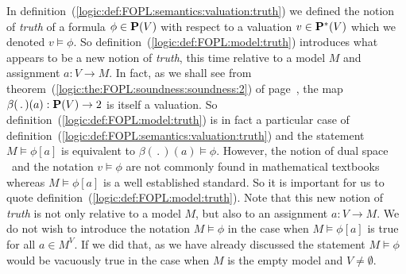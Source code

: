 In definition~(\ref{logic:def:FOPL:semantics:valuation:truth}) we
defined the notion of {\em truth} of a formula $\phi\in\mbox{${\bf P}(V)$}$ with
respect to a valuation $v\in\mbox{${\bf P}^{*}(V)$}$ which we denoted $v\vDash\phi$. So
definition~(\ref{logic:def:FOPL:model:truth}) introduces what
appears to be a new notion of {\em truth}, this time relative to a
model $M$ and assignment $a:V\to M$. In fact, as we shall see from
theorem~(\ref{logic:the:FOPL:soundness:soundness:2}) of
page~\pageref{logic:the:FOPL:soundness:soundness:2}, the map
$\beta(\,.\,)(a):\mbox{${\bf P}(V)$}\to 2$ is itself a valuation. So
definition~(\ref{logic:def:FOPL:model:truth}) is in fact a
particular case of
definition~(\ref{logic:def:FOPL:semantics:valuation:truth}) and the
statement $M\vDash\phi[a]$ is equivalent to
$\beta(\,.\,)(a)\vDash\phi$. However, the notion of dual space \pvd\
and the notation $v\vDash\phi$ are not commonly found in
mathematical textbooks whereas $M\vDash\phi[a]$ is a well
established standard. So it is important for us to quote
definition~(\ref{logic:def:FOPL:model:truth}). Note that this new
notion of {\em truth} is not only relative to a model $M$, but also
to an assignment $a:V\to M$. We do not wish to introduce the
notation $M\vDash\phi$ in the case when $M\vDash\phi[a]$ is true for
all $a\in M^{V}$. If we did that, as we have already discussed the
statement $M\vDash\phi$ would be vacuously true in the case when $M$
is the empty model and $V\neq\emptyset$.
